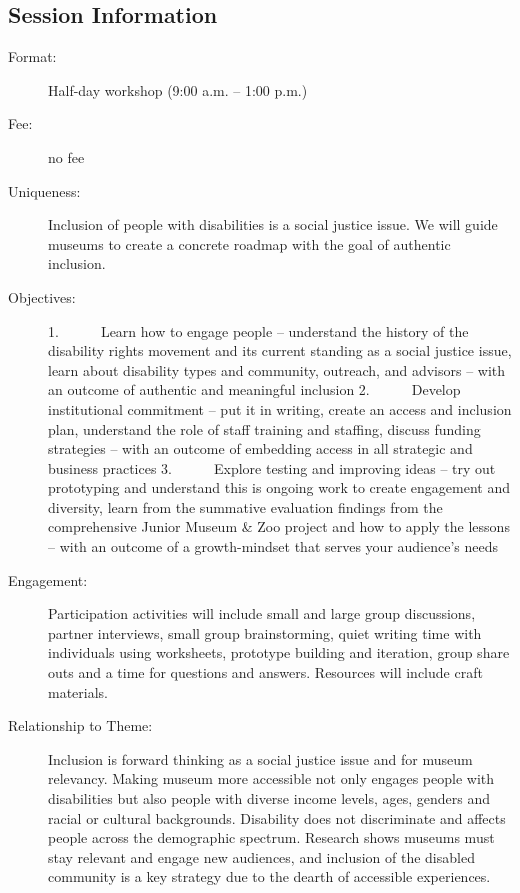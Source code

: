 \documentclass{report}
\begin{document}
              \subsection*{Session Information}
                \begin{description}
                  \item [Format:] Half-day workshop (9:00 a.m. – 1:00 p.m.)
							    
								  \item [Fee:]no fee
							     
							    \item [Uniqueness:]Inclusion of people with disabilities is a social justice issue. We will guide museums to create a concrete roadmap with the goal of authentic inclusion.
							    \item [Objectives:]1.      Learn how to engage people – understand the history of the disability rights movement and its current standing as a social justice issue, learn about disability types and community, outreach, and advisors – with an outcome of authentic and meaningful inclusion
2.      Develop institutional commitment – put it in writing, create an access and inclusion plan, understand the role of staff training and staffing, discuss funding strategies – with an outcome of embedding access in all strategic and business practices
3.      Explore testing and improving ideas – try out prototyping and understand this is ongoing work to create engagement and diversity, learn from the summative evaluation findings from the comprehensive Junior Museum \& Zoo project and how to apply the lessons – with an outcome of a growth-mindset that serves your audience’s needs
							    \item [Engagement:]Participation activities will include small and large group discussions, partner interviews, small group brainstorming, quiet writing time with individuals using worksheets, prototype building and iteration, group share outs and a time for questions and answers. Resources will include craft materials.
							    \item [Relationship to Theme:]Inclusion is forward thinking as a social justice issue and for museum relevancy. Making museum more accessible not only engages people with disabilities but also people with diverse income levels, ages, genders and racial or cultural backgrounds. Disability does not discriminate and affects people across the demographic spectrum. Research shows museums must stay relevant and engage new audiences, and inclusion of the disabled community is a key strategy due to the dearth of accessible experiences.
							    

\end{description}
\end{document}
